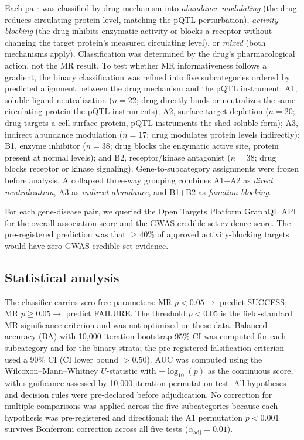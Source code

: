 \documentclass[11pt]{article}
\begin{document}
Each pair was classified by drug mechanism into \emph{abundance-modulating} (the drug reduces circulating protein level, matching the pQTL perturbation), \emph{activity-blocking} (the drug inhibits enzymatic activity or blocks a receptor without changing the target protein's measured circulating level), or \emph{mixed} (both mechanisms apply). Classification was determined by the drug's pharmacological action, not the MR result. To test whether MR informativeness follows a gradient, the binary classification was refined into five subcategories ordered by predicted alignment between the drug mechanism and the pQTL instrument: A1, soluble ligand neutralization ($n = 22$; drug directly binds or neutralizes the same circulating protein the pQTL instruments); A2, surface target depletion ($n = 20$; drug targets a cell-surface protein, pQTL instruments the shed soluble form); A3, indirect abundance modulation ($n = 17$; drug modulates protein levels indirectly); B1, enzyme inhibitor ($n = 38$; drug blocks the enzymatic active site, protein present at normal levels); and B2, receptor/kinase antagonist ($n = 38$; drug blocks receptor or kinase signaling). Gene-to-subcategory assignments were frozen before analysis. A collapsed three-way grouping combines A1+A2 as \emph{direct neutralization}, A3 as \emph{indirect abundance}, and B1+B2 as \emph{function blocking}.

For each gene-disease pair, we queried the Open Targets Platform GraphQL API for the overall association score and the GWAS credible set evidence score. The pre-registered prediction was that $\geq 40\%$ of approved activity-blocking targets would have zero GWAS credible set evidence.

\subsection{Statistical analysis}

The classifier carries zero free parameters: MR $p < 0.05 \rightarrow$ predict SUCCESS; MR $p \geq 0.05 \rightarrow$ predict FAILURE. The threshold $p < 0.05$ is the field-standard MR significance criterion and was not optimized on these data. Balanced accuracy (BA) with 10{,}000-iteration bootstrap 95\% CI was computed for each subcategory and for the binary strata; the pre-registered falsification criterion used a 90\% CI (CI lower bound $> 0.50$). AUC was computed using the Wilcoxon--Mann--Whitney $U$-statistic with $-\log_{10}(p)$ as the continuous score, with significance assessed by 10{,}000-iteration permutation test. All hypotheses and decision rules were pre-declared before adjudication. No correction for multiple comparisons was applied across the five subcategories because each hypothesis was pre-registered and directional; the A1 permutation $p < 0.001$ survives Bonferroni correction across all five tests ($\alpha_{\text{adj}} = 0.01$).
\end{document}
